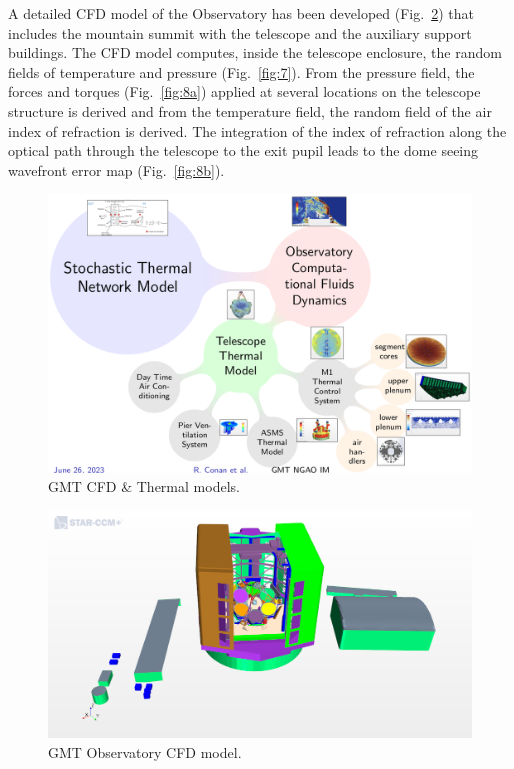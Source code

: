 \documentclass[]{AO4ELT}  %
\begin{document}
A detailed CFD model of the Observatory has been developed (Fig.~\ref{fig:6}) that includes the mountain summit
with the telescope and the auxiliary support buildings.
The CFD model computes, inside the telescope enclosure, the random fields of temperature and pressure (Fig.~\ref{fig:7}).
From the pressure field, the forces and torques (Fig.~\ref{fig:8a}) applied at several locations on the telescope structure is derived and
from the temperature field, the random field of the air index of refraction is derived.
The integration of the index of refraction along the optical path through the telescope
to the exit pupil leads to the dome seeing wavefront error map (Fig.~\ref{fig:8b}).

\begin{figure}
   \centering
   \includegraphics[width=0.7\linewidth]{./figures/cfd-thermal_models.png}
   \caption{GMT CFD \& Thermal models.}
   \label{fig:5}
\end{figure}

\begin{figure}
   \centering
   \includegraphics[trim= 0 0 0 2cm,clip,width=0.95\linewidth]{./figures/zen30az000_OS7_Geometry Scene 2.png}
   \caption{GMT Observatory CFD model.}
   \label{fig:6}
\end{figure}
\end{document}
